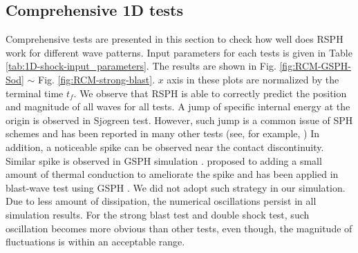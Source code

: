 \subsection{Comprehensive 1D tests} \label{sec:comprehensive-1d-tests}
Comprehensive tests are presented in this section to check how well does RSPH work for different wave patterns. Input parameters for each tests is given in Table \ref{tab:1D-shock-input_parameters}.
The results are shown in Fig. \ref{fig:RCM-GSPH-Sod} $\sim$ Fig. \ref{fig:RCM-strong-blast}. $x$ axis in these plots are normalized by the terminal time $t_f$. 
We observe that RSPH is able to correctly predict the position and magnitude of all waves for all tests. A jump of specific internal energy at the origin is observed in Sj$\ddot{o}$green test. However, such jump is a common issue of SPH schemes and has been reported in many other tests (see, for example, \citep{monaghan1997sph,cha2003implementations,puri2014approximate})
In addition, a noticeable spike can be observed near the contact discontinuity. Similar spike is observed in GSPH simulation \citep{puri2014comparison}.
\citet{noh1987errors} proposed to adding a small amount of thermal conduction to ameliorate the spike and has been applied in blast-wave test using GSPH \citep{puri2014comparison}. We did not adopt such strategy in our simulation.
Due to less amount of dissipation, the numerical oscillations
 persist in all simulation results. For the strong blast test and double shock test, such oscillation becomes more obvious than other tests, even though, the magnitude of fluctuations is within an acceptable range.

